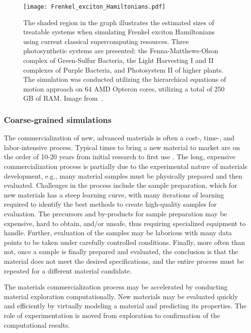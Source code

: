 \begin{figure}
    \centering
    \texttt{[image: Frenkel\_exciton\_Hamiltonians.pdf]}
    \caption{The shaded region in the graph illustrates the estimated sizes of treatable systems when simulating Frenkel exciton Hamiltonians using current classical supercomputing resources.  Three photosynthetic systems are presented: the Fenna-Matthews-Olson complex of Green-Sulfur Bacteria, the Light Harvesting I and II complexes of Purple Bacteria, and Photosystem II of higher plants. The simulation was conducted utilizing the hierarchical equations of motion approach on 64 AMD Opteron cores, utilizing a total of 250 GB of RAM. Image from~\cite{Mostame2016}.}
    \label{fig:Frenkel}
\end{figure}

\subsubsection{Coarse-grained simulations}


The commercialization of new, advanced materials is often a cost-, time-, and labor-intensive process.  Typical times to bring a new material to market are on the order of 10-20 years from initial research to first use \cite{national2011materials}.
The long, expensive commercialization process is partially due to the experimental nature of materials development, e.g., many material samples must be physically prepared and then evaluated.  Challenges in the process include the sample preparation, which for new materials has a steep learning curve, with many iterations of learning required to identify the best methods to create high-quality samples for evaluation.  The precursors and by-products for sample preparation may be expensive, hard to obtain, and/or unsafe, thus requiring specialized equipment to handle.  Further, evaluation of the samples may be laborious with many data points to be taken under carefully controlled conditions.  Finally, more often than not, once a sample is finally prepared and evaluated, the conclusion is that the material does not meet the desired specifications, and the entire process must be repeated for a different material candidate.

The materials commercialization process may be accelerated by conducting material exploration computationally.  New materials may be evaluated quickly and efficiently by virtually modeling a material and predicting its properties.  The role of experimentation is moved from exploration to confirmation of the computational results. 

